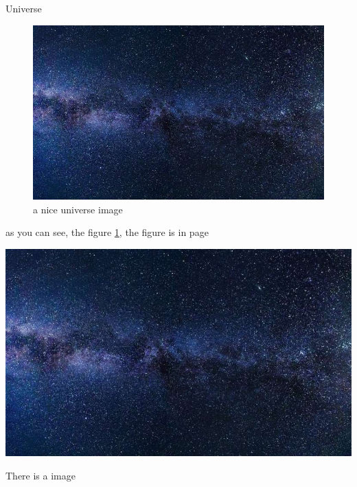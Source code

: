 \documentclass{article}
\begin{document}
Universe

\begin{figure}[h]
	\centering
	\includegraphics[width=1\textwidth]{universe}
	\caption{a nice universe image}
	\label{fig:universe1}
\end{figure}

as you can see, the figure \ref{fig:universe1},
the figure is in page \pageref{fig:universe1}

\includegraphics{universe}

There is a image
\end{document}
